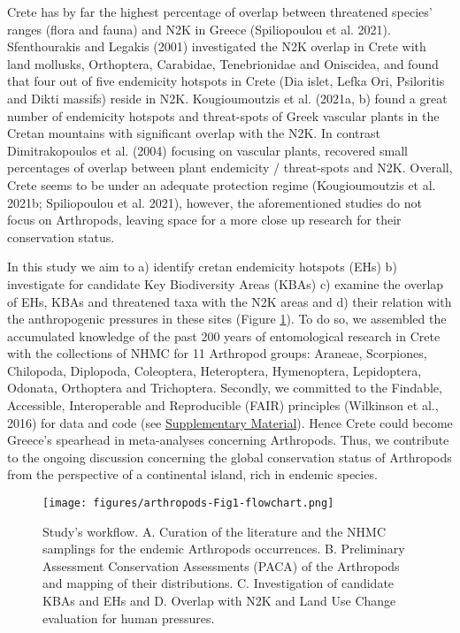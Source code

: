 Crete has by far the highest percentage of overlap between threatened species’
ranges (flora and fauna) and N2K in Greece (Spiliopoulou et al. 2021).
Sfenthourakis and Legakis (2001) investigated the N2K overlap in Crete with
land mollusks, Orthoptera, Carabidae, Tenebrionidae and Oniscidea, and found
that four out of five endemicity hotspots in Crete (Dia islet, Lefka Ori,
Psiloritis and Dikti massifs) reside in N2K. Kougioumoutzis et al. (2021a, b)
found a great number of endemicity hotspots and threat-spots of Greek vascular
plants in the Cretan mountains with significant overlap with the N2K.
In contrast Dimitrakopoulos et al. (2004) focusing on vascular plants,
recovered small percentages of overlap between plant endemicity / threat-spots and N2K.
Overall, Crete seems to be under an adequate protection regime (Kougioumoutzis et al. 2021b; Spiliopoulou et al. 2021),
however, the aforementioned studies do not focus on Arthropods, leaving space
for a more close up research for their conservation status.

In this study we aim to a) identify cretan endemicity hotspots (EHs)
b) investigate for candidate Key Biodiversity Areas (KBAs)
c) examine the overlap of EHs, KBAs and threatened taxa with the N2K areas and
d) their relation with the anthropogenic pressures in these sites (Figure \ref{fig:arthropods-fig1}).
To do so, we assembled the accumulated knowledge of the past 200 years of
entomological research in Crete with the collections of NHMC for 11 Arthropod groups:
Araneae, Scorpiones, Chilopoda, Diplopoda, Coleoptera, Heteroptera,
Hymenoptera, Lepidoptera, Odonata, Orthoptera and Trichoptera.
Secondly, we committed to the Findable, Accessible, Interoperable and Reproducible (FAIR) principles (Wilkinson et al., 2016)
for data and code (see \href{https://doi.org/10.5281/zenodo.10635645}{Supplementary Material}). Hence Crete could become Greece’s
spearhead in meta-analyses concerning Arthropods. Thus, we contribute to the
ongoing discussion concerning the global conservation status of Arthropods from
the perspective of a continental island, rich in endemic species.

   \begin{figure}[h]
      \centering
      \texttt{[image: figures/arthropods-Fig1-flowchart.png]}
      \caption[The study's workflow]{Study’s workflow. A. Curation of the literature and the NHMC samplings for the endemic Arthropods occurrences. B. Preliminary Assessment Conservation Assessments (PACA) of the Arthropods and mapping of their distributions. C. Investigation of candidate KBAs and EHs and D. Overlap with N2K and Land Use Change evaluation for human pressures.}
      \label{fig:arthropods-fig1}
   \end{figure}

